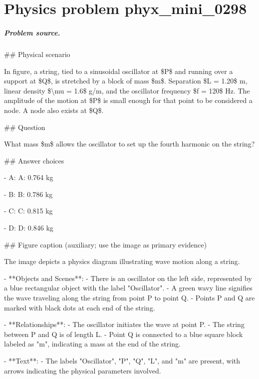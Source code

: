 
\chapter{Physics problem phyx\_mini\_0298}
\label{ch:PhyXMiniProblems_problem_phyx_mini_0298}

\paragraph{Problem source.}
\#\# Physical scenario

In figure, a string, tied to a sinusoidal oscillator at \$P\$ and running over a support at \$Q\$, is stretched by a block of mass \$m\$. Separation \$L = 1.20\$ m, linear density \$\textbackslash{}mu = 1.6\$ g/m, and the oscillator frequency \$f = 120\$ Hz. The amplitude of the motion at \$P\$ is small enough for that point to be considered a node. A node also exists at \$Q\$.

\#\# Question

What mass \$m\$ allows the oscillator to set up the fourth harmonic on the string?

\#\# Answer choices

- A: A: 0.764 kg

- B: B: 0.786 kg

- C: C: 0.815 kg

- D: D: 0.846 kg

\#\# Figure caption (auxiliary; use the image as primary evidence)

The image depicts a physics diagram illustrating wave motion along a string. 

- **Objects and Scenes**: 
  - There is an oscillator on the left side, represented by a blue rectangular object with the label "Oscillator".
  - A green wavy line signifies the wave traveling along the string from point P to point Q.
  - Points P and Q are marked with black dots at each end of the string.

- **Relationships**:
  - The oscillator initiates the wave at point P.
  - The string between P and Q is of length L.
  - Point Q is connected to a blue square block labeled as "m", indicating a mass at the end of the string.

- **Text**:
  - The labels "Oscillator", "P", "Q", "L", and "m" are present, with arrows indicating the physical parameters involved. 

